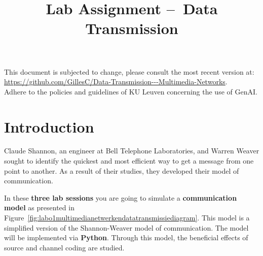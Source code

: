 \documentclass[12pt,a4paper]{article}
\title{Lab Assignment --\ Data Transmission\\\vspace{0.5cm}{\Large Multimedia Networks}}
\author{\authorName}
\begin{document}
\maketitle
\vfill

\begin{center}

  \begin{minipage}{0.65\linewidth}
\vfill
{\footnotesize
This document is subjected to change, please consult the most recent version at: \url{https://github.com/GillesC/Data-Transmission---Multimedia-Networks}.\\

Adhere to the policies and guidelines of KU Leuven concerning the use of GenAI.
}
\end{minipage}
\end{center}

\vfill
\clearpage


\section{Introduction}
Claude Shannon, an engineer at Bell Telephone Laboratories, and Warren Weaver sought to identify the quickest and most efficient way to get a message from one point to another. As a result of their studies, they developed their model of communication.

In these \textbf{three lab sessions} you are going to simulate a \textbf{communication model} as presented in Figure~\vref{fig:labo1multimedianetwerkendatatransmissiediagram}. This model is a simplified version of the Shannon-Weaver model of communication. The model will be implemented via \textbf{Python}. Through this model, the beneficial effects of source and channel coding are studied. 
\end{document}
